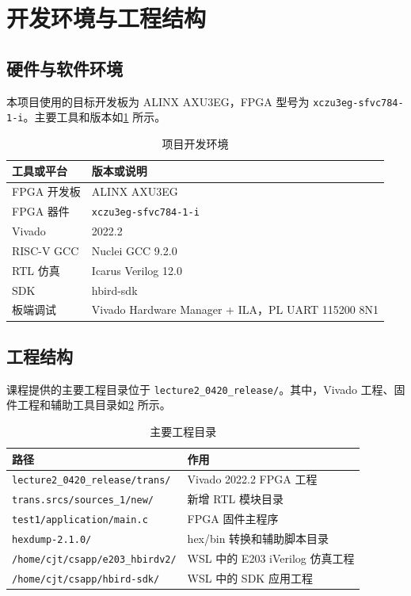 \documentclass[12pt, a4paper]{article}
\begin{document}
\section{开发环境与工程结构}

\subsection{硬件与软件环境}

本项目使用的目标开发板为 ALINX AXU3EG，FPGA 型号为 \texttt{xczu3eg-sfvc784-1-i}。主要工具和版本如\cref{tab:env} 所示。

\begin{table}[H]
    \centering
    \caption{项目开发环境}
    \label{tab:env}
    \begin{tabular}{ll}
        \toprule
        \textbf{工具或平台} & \textbf{版本或说明} \\
        \midrule
        FPGA 开发板 & ALINX AXU3EG \\
        FPGA 器件 & \texttt{xczu3eg-sfvc784-1-i} \\
        Vivado & 2022.2 \\
        RISC-V GCC & Nuclei GCC 9.2.0 \\
        RTL 仿真 & Icarus Verilog 12.0 \\
        SDK & hbird-sdk \\
        板端调试 & Vivado Hardware Manager + ILA，PL UART 115200 8N1 \\
        \bottomrule
    \end{tabular}
\end{table}

\subsection{工程结构}

课程提供的主要工程目录位于 \texttt{lecture2\_0420\_release/}。其中，Vivado 工程、固件工程和辅助工具目录如\cref{tab:layout} 所示。

\begin{table}[H]
    \centering
    \caption{主要工程目录}
    \label{tab:layout}
    \begin{tabular}{ll}
        \toprule
        \textbf{路径} & \textbf{作用} \\
        \midrule
        \texttt{lecture2\_0420\_release/trans/} & Vivado 2022.2 FPGA 工程 \\
        \texttt{trans.srcs/sources\_1/new/} & 新增 RTL 模块目录 \\
        \texttt{test1/application/main.c} & FPGA 固件主程序 \\
        \texttt{hexdump-2.1.0/} & hex/bin 转换和辅助脚本目录 \\
        \texttt{/home/cjt/csapp/e203\_hbirdv2/} & WSL 中的 E203 iVerilog 仿真工程 \\
        \texttt{/home/cjt/csapp/hbird-sdk/} & WSL 中的 SDK 应用工程 \\
        \bottomrule
    \end{tabular}
\end{table}
\end{document}
